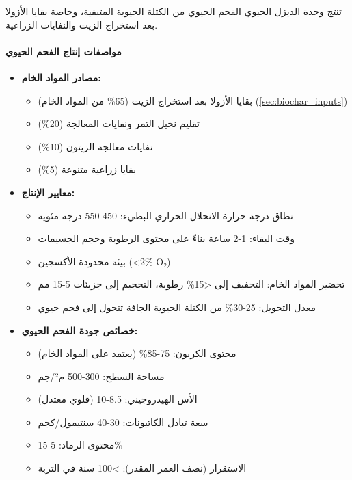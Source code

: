 تنتج وحدة الديزل الحيوي الفحم الحيوي من الكتلة الحيوية المتبقية، وخاصة بقايا الأزولا بعد استخراج الزيت والنفايات الزراعية.

\paragraph{مواصفات إنتاج الفحم الحيوي}
\begin{itemize}
    \item \textbf{مصادر المواد الخام:}
    \begin{itemize}
        \item بقايا الأزولا بعد استخراج الزيت (65\% من المواد الخام) (\ref{sec:biochar_inputs})
        \item تقليم نخيل التمر ونفايات المعالجة (20\%)
        \item نفايات معالجة الزيتون (10\%)
        \item بقايا زراعية متنوعة (5\%)
    \end{itemize}
    
    \item \textbf{معايير الإنتاج:}
    \begin{itemize}
        \item نطاق درجة حرارة الانحلال الحراري البطيء: 450-550 درجة مئوية
        \item وقت البقاء: 1-2 ساعة بناءً على محتوى الرطوبة وحجم الجسيمات
        \item بيئة محدودة الأكسجين (<2\% O₂)
        \item تحضير المواد الخام: التجفيف إلى <15\% رطوبة، التحجيم إلى جزيئات 5-15 مم
        \item معدل التحويل: 25-30\% من الكتلة الحيوية الجافة تتحول إلى فحم حيوي
    \end{itemize}
    
    \item \textbf{خصائص جودة الفحم الحيوي:}
    \begin{itemize}
        \item محتوى الكربون: 75-85\% (يعتمد على المواد الخام)
        \item مساحة السطح: 300-500 م²/جم
        \item الأس الهيدروجيني: 8.5-10 (قلوي معتدل)
        \item سعة تبادل الكاتيونات: 30-40 سنتيمول/كجم
        \item محتوى الرماد: 5-15\%
        \item الاستقرار (نصف العمر المقدر): >100 سنة في التربة
    \end{itemize}
\end{itemize}

